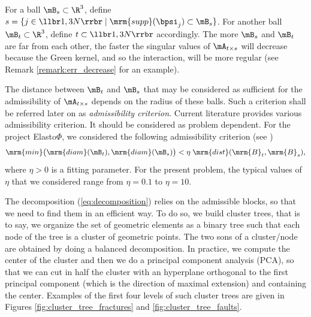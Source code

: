 For a ball $\mB_{s}\subset \R^{3}$, define $s = \{j \in\llbr 1,3N\rrbr\;\vert \;\mrm{supp}(\bpsi_{j})\subset \mB_{s}\}$. 
For another ball $\mB_{t}\subset \R^{3}$, define $t\subset \llbr1,3N\rrbr$ accordingly.  
The more $\mB_{s}$ and $\mB_{t}$ are far from each other, the faster the singular values of $\mA_{t \times s}$ will decrease because the Green kernel, and so the interaction, will be more regular (see Remark \ref{remark:err_decrease} for an example).

The distance between $\mB_{t}$ and $\mB_{s}$ that may be considered as sufficient for the admissibility of $\mA_{t \times s}$ depends on the radius of these balls. 
Such a criterion shall be referred later on as \textit{admissibility criterion}. Current literature provides various 
admissibility criterion. It should be considered as problem dependent. For the project Elasto$\Phi$, we considered the 
following admissibility criterion (see \cite{Rjasanow2007})
\begin{equation}\label{AdmissibilityCondition}
\mrm{min}\big( \mrm{diam}(\mB_{t}),\mrm{diam}(\mB_{s})\big)< \eta\;\mrm{dist}(\mrm{B}_{t},\mrm{B}_{s}),
\end{equation}
where $\eta>0$ is a fitting parameter. For the present problem, the typical values of $\eta$ that we considered  
range from $\eta = 0.1$ to $\eta = 10$. 

The decomposition (\ref{eq:decomposition}) relies on the admissible blocks, so that we need to find them in an efficient way. To do so, we build cluster trees, that is to say, we organize the set of geometric elements as a binary tree such that each node of the tree is a cluster of geometric points. The two sons of a cluster/node are obtained by doing a balanced decomposition. In practice, we compute the center of the cluster and then we do a principal component analysis (PCA), so that we can cut in half the cluster with an hyperplane orthogonal to the first principal component (which is the direction of maximal extension) and containing the center. Examples of the first four levels of such cluster trees are given in Figures \ref{fig:cluster_tree_fractures} and \ref{fig:cluster_tree_faults}.

